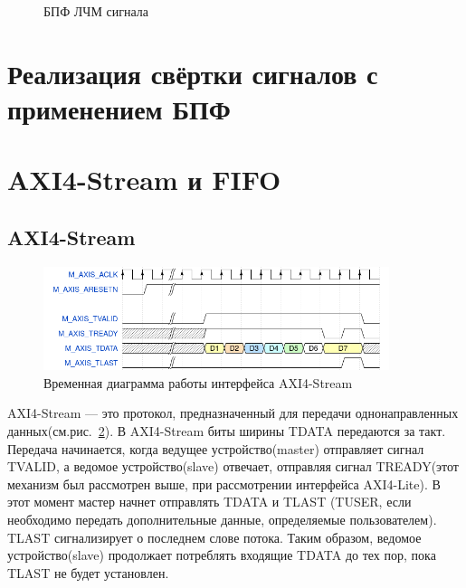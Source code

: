 \documentclass[a4paper,oneside ,14pt]{extreport}
\begin{document}
\begin{figure}[h]
    \centering
    \noindent
    \caption{БПФ ЛЧМ сигнала}
    \label{fig:chirp_fft}
\end{figure}

\section{Реализация свёртки сигналов с применением БПФ}

\section{AXI4-Stream и FIFO}

\subsection{AXI4-Stream}

\begin{figure}[h]
	\centering
	\includegraphics[width=0.9\textwidth]{image/axis_0.png}
	\caption{Временная диаграмма работы интерфейса AXI4-Stream}
	\label{axis}
\end{figure}

AXI4-Stream — это протокол, предназначенный для передачи однонаправленных данных(см.рис.~\ref{axis}). В AXI4-Stream биты ширины TDATA передаются за такт. Передача начинается, когда ведущее устройство(master) отправляет сигнал TVALID, а ведомое устройство(slave) отвечает, отправляя сигнал TREADY(этот механизм был рассмотрен выше, при рассмотрении интерфейса AXI4-Lite). В этот момент мастер начнет отправлять TDATA и TLAST (TUSER, если необходимо передать дополнительные данные, определяемые пользователем). TLAST сигнализирует о последнем слове потока. Таким образом, ведомое устройство(slave) продолжает потреблять входящие TDATA до тех пор, пока TLAST не будет установлен.
\end{document}
